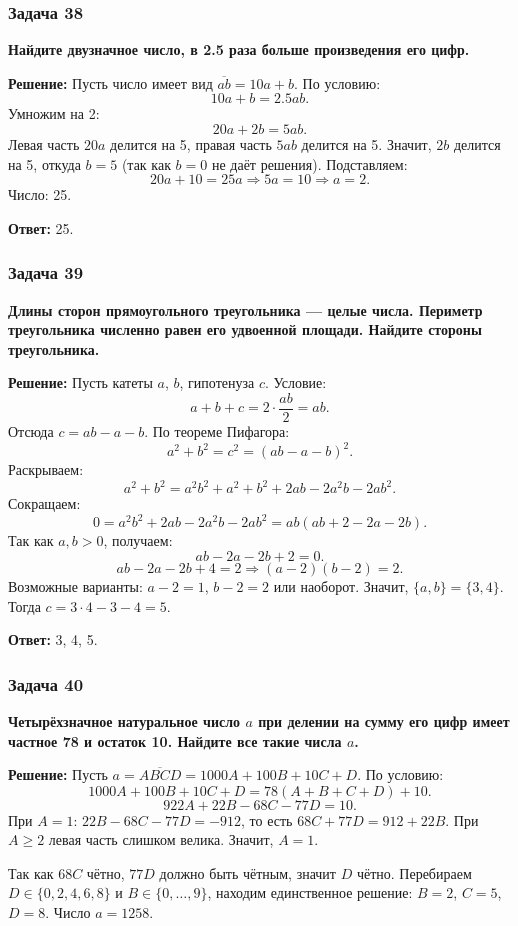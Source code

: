 \documentclass[12pt, a4paper]{article}
\begin{document}
\subsubsection*{Задача 38}
\textbf{Найдите двузначное число, в 2.5 раза больше произведения его цифр.}

\textbf{Решение:}
Пусть число имеет вид $\overline{ab} = 10a + b$. По условию:
\[
10a + b = 2.5ab.
\]
Умножим на 2:
\[
20a + 2b = 5ab.
\]
Левая часть $20a$ делится на 5, правая часть $5ab$ делится на 5. Значит, $2b$ делится на 5, откуда $b = 5$ (так как $b = 0$ не даёт решения). Подставляем:
\[
20a + 10 = 25a \Rightarrow 5a = 10 \Rightarrow a = 2.
\]
Число: 25.

\textbf{Ответ:} 25.

\subsubsection*{Задача 39}
\textbf{Длины сторон прямоугольного треугольника — целые числа. Периметр треугольника численно равен его удвоенной площади. Найдите стороны треугольника.}

\textbf{Решение:}
Пусть катеты $a$, $b$, гипотенуза $c$. Условие:
\[
a + b + c = 2 \cdot \frac{ab}{2} = ab.
\]
Отсюда $c = ab - a - b$. По теореме Пифагора:
\[
a^2 + b^2 = c^2 = (ab - a - b)^2.
\]
Раскрываем:
\[
a^2 + b^2 = a^2b^2 + a^2 + b^2 + 2ab - 2a^2b - 2ab^2.
\]
Сокращаем:
\[
0 = a^2b^2 + 2ab - 2a^2b - 2ab^2 = ab(ab + 2 - 2a - 2b).
\]
Так как $a, b > 0$, получаем:
\[
ab - 2a - 2b + 2 = 0.
\]
\[
ab - 2a - 2b + 4 = 2 \Rightarrow (a-2)(b-2) = 2.
\]
Возможные варианты: $a-2 = 1$, $b-2 = 2$ или наоборот. Значит, $\{a, b\} = \{3, 4\}$. Тогда $c = 3 \cdot 4 - 3 - 4 = 5$.

\textbf{Ответ:} 3, 4, 5.

\subsubsection*{Задача 40}
\textbf{Четырёхзначное натуральное число $a$ при делении на сумму его цифр имеет частное 78 и остаток 10. Найдите все такие числа $a$.}

\textbf{Решение:}
Пусть $a = \overline{ABCD} = 1000A + 100B + 10C + D$. По условию:
\[
1000A + 100B + 10C + D = 78(A+B+C+D) + 10.
\]
\[
922A + 22B - 68C - 77D = 10.
\]
При $A = 1$: $22B - 68C - 77D = -912$, то есть $68C + 77D = 912 + 22B$. При $A \ge 2$ левая часть слишком велика. Значит, $A = 1$.

Так как $68C$ чётно, $77D$ должно быть чётным, значит $D$ чётно. Перебираем $D \in \{0,2,4,6,8\}$ и $B \in \{0,\ldots,9\}$, находим единственное решение: $B=2$, $C=5$, $D=8$. Число $a = 1258$.
\end{document}
